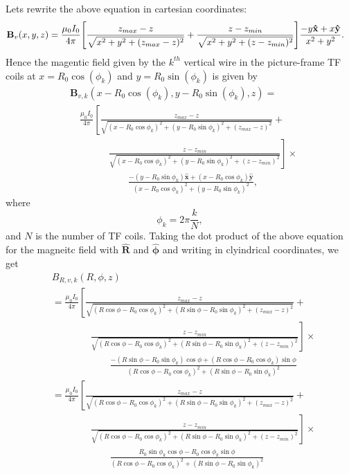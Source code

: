 \documentclass{article}
\let\vec\mathbf
\begin{document}
Lets rewrite the above equation in cartesian coordinates:
\[
\begin{aligned}
    \vec{B}_{v}(x, y, z) &= \frac{\mu_0 I_0}{4\pi}\qty[\frac{z_{max}-z}{\sqrt{x^2+y^2+(z_{max}-z)^2}} + \frac{z-z_{min}}{\sqrt{x^2+y^2+(z-z_{min})^2}}]\frac{-y\vec{\hat{x}}+x\vec{\hat{y}}}{x^2+y^2}.
\end{aligned}\]
Hence the magentic field given by the $k^{th}$ vertical wire in the picture-frame TF coils
at $x=R_0\cos(\phi_k)$ and $y=R_0\sin(\phi_k)$ is given by
\[
\begin{aligned}
    &\vec{B}_{v,k}(x-R_0\cos(\phi_k), y-R_0\sin(\phi_k), z) = \\
    &\quad\frac{\mu_0 I_0}{4\pi}\left[\frac{z_{max}-z}{\sqrt{(x-R_0\cos\phi_k)^2+(y-R_0\sin\phi_k)^2+(z_{max}-z)^2}} + \right.\\
    &\qquad\qquad\left.\frac{z-z_{min}}{\sqrt{(x-R_0\cos\phi_k)^2+(y-R_0\sin\phi_k)^2+(z-z_{min})^2}}\right]\times\\
    &\qquad\qquad\qquad\frac{-(y-R_0\sin\phi_k)\vec{\hat{x}}+(x-R_0\cos\phi_k)\vec{\hat{y}}}{(x-R_0\cos\phi_k)^2+(y-R_0\sin\phi_k)^2},
\end{aligned}
\]
where
\[\phi_k = 2\pi\frac{k}{N},\]
and $N$ is the number of TF coils.
Taking the dot product of the above equation for the magneitc field with $\vec{\hat{R}}$ and $\vec{\hat{\phi}}$
and writing in clyindrical coordinates, we get
\[
\begin{aligned}
    &B_{R,v,k}(R, \phi, z) \\
    &=\frac{\mu_0 I_0}{4\pi}\left[\frac{z_{max}-z}{\sqrt{(R\cos\phi-R_0\cos\phi_k)^2+(R\sin\phi-R_0\sin\phi_k)^2+(z_{max}-z)^2}} + \right.\\
    &\qquad\qquad\left.\frac{z-z_{min}}{\sqrt{(R\cos\phi-R_0\cos\phi_k)^2+(R\sin\phi-R_0\sin\phi_k)^2+(z-z_{min})^2}}\right]\times\\
    &\qquad\qquad\qquad\frac{-(R\sin\phi-R_0\sin\phi_k)\cos\phi+(R\cos\phi-R_0\cos\phi_k)\sin\phi}{(R\cos\phi-R_0\cos\phi_k)^2+(R\sin\phi-R_0\sin\phi_k)^2} \\
    &=\frac{\mu_0 I_0}{4\pi}\left[\frac{z_{max}-z}{\sqrt{(R\cos\phi-R_0\cos\phi_k)^2+(R\sin\phi-R_0\sin\phi_k)^2+(z_{max}-z)^2}} + \right.\\
    &\qquad\qquad\left.\frac{z-z_{min}}{\sqrt{(R\cos\phi-R_0\cos\phi_k)^2+(R\sin\phi-R_0\sin\phi_k)^2+(z-z_{min})^2}}\right]\times\\
    &\qquad\qquad\qquad\frac{R_0\sin\phi_k\cos\phi-R_0\cos\phi_k\sin\phi}{(R\cos\phi-R_0\cos\phi_k)^2+(R\sin\phi-R_0\sin\phi_k)^2} \\
\end{aligned}
\]
\end{document}
